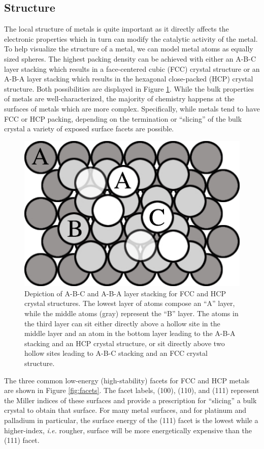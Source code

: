 \subsection{Structure}
The local structure of metals is quite important as it directly affects the
electronic properties which in turn can modify the catalytic activity of the
metal. To help visualize the structure of a metal, we can model metal atoms as equally
sized spheres. The highest packing density can be achieved with either an A-B-C
layer stacking which results in a face-centered cubic (FCC) crystal structure
or an A-B-A layer stacking which results in the hexagonal close-packed (HCP)
crystal structure. Both possibilities are displayed in Figure
\ref{fig:packing}. While the bulk properties of metals are well-characterized,
the majority of chemistry happens at the surfaces of metals which
are more complex. Specifically, while metals tend to have FCC or HCP packing,
depending on the termination or ``slicing'' of the bulk crystal a variety of exposed
surface facets are possible.

\begin{figure}[p!]
  \centering
  \includegraphics[width=0.8\linewidth]{../figures/chap1/packing.pdf}
  \caption{Depiction of A-B-C and A-B-A layer stacking for FCC and HCP crystal
structures. The lowest layer of atoms compose an ``A'' layer, while the middle
atoms (gray) represent the ``B'' layer. The atoms in the third layer can sit
either directly above a hollow site in the middle layer and an atom in the
bottom layer leading to the A-B-A stacking and an HCP crystal structure, or sit
directly above two hollow sites leading to A-B-C stacking and an FCC crystal
structure.}
  \label{fig:packing}
\end{figure}

The three common low-energy (high-stability) facets for FCC and HCP
metals are shown in Figure \ref{fig:facets}. The facet labels, (100),
(110), and (111) represent the Miller indices of these surfaces and provide a
prescription for ``slicing'' a bulk crystal to obtain that surface. For many
metal surfaces, and for platinum and palladium in particular, the surface energy of the
(111) facet is the lowest while a higher-index,
{\em i.e.} rougher, surface will be more energetically expensive than the (111) facet.

